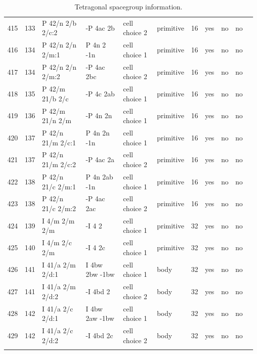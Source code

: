 \begin{center}
\begin{small}
\begin{longtable}{|l|l|l|l|l|l|l|l|l|l|l|}
415 &133 &P 42/n 2/b 2/c:2 &-P 4ac 2b &cell choice 2 &primitive &16 &yes &no &no \\ 
416 &134 &P 42/n 2/n 2/m:1 &P 4n 2 -1n &cell choice 1 &primitive &16 &yes &no &no \\ 
417 &134 &P 42/n 2/n 2/m:2 &-P 4ac 2bc &cell choice 2 &primitive &16 &yes &no &no \\ 
418 &135 &P 42/m 21/b 2/c &-P 4c 2ab &cell choice 1 &primitive &16 &yes &no &no \\ 
419 &136 &P 42/m 21/n 2/m &-P 4n 2n &cell choice 1 &primitive &16 &yes &no &no \\ 
420 &137 &P 42/n 21/m 2/c:1 &P 4n 2n -1n &cell choice 1 &primitive &16 &yes &no &no \\ 
421 &137 &P 42/n 21/m 2/c:2 &-P 4ac 2a &cell choice 2 &primitive &16 &yes &no &no \\ 
422 &138 &P 42/n 21/c 2/m:1 &P 4n 2ab -1n &cell choice 1 &primitive &16 &yes &no &no \\ 
423 &138 &P 42/n 21/c 2/m:2 &-P 4ac 2ac &cell choice 2 &primitive &16 &yes &no &no \\ 
424 &139 &I 4/m 2/m 2/m &-I 4 2 &cell choice 1 &primitive &32 &yes &no &no \\ 
425 &140 &I 4/m 2/c 2/m &-I 4 2c &cell choice 1 &primitive &32 &yes &no &no \\ 
426 &141 &I 41/a 2/m 2/d:1 &I 4bw 2bw -1bw &cell choice 1 &body &32 &yes &no &no \\ 
427 &141 &I 41/a 2/m 2/d:2 &-I 4bd 2 &cell choice 2 &body &32 &yes &no &no \\ 
428 &142 &I 41/a 2/c 2/d:1 &I 4bw 2aw -1bw &cell choice 1 &body &32 &yes &no &no \\ 
429 &142 &I 41/a 2/c 2/d:2 &-I 4bd 2c &cell choice 2 &body &32 &yes &no &no \\ 
\hline
\caption{Tetragonal spacegroup information.}
\end{longtable}


\end{small}
\end{center}
